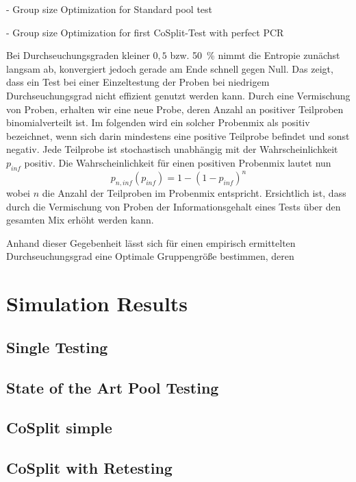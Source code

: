 \documentclass[fleqn,10pt]{wlscirep}
\begin{document}
\label{sec:analytics}
- Group size Optimization for Standard pool test

- Group size Optimization for first CoSplit-Test with perfect PCR

Bei Durchseuchungsgraden kleiner $0,5$ bzw. \SI{50}{\percent} nimmt die Entropie zunächst langsam ab, konvergiert jedoch gerade am Ende schnell gegen Null. Das zeigt, dass ein Test bei einer Einzeltestung der Proben bei niedrigem Durchseuchungsgrad nicht effizient genutzt werden kann.
Durch eine Vermischung von Proben, erhalten wir eine neue Probe, deren Anzahl an positiver Teilproben binomialverteilt ist. Im folgenden wird ein solcher Probenmix als positiv bezeichnet, wenn sich darin mindestens eine positive Teilprobe befindet und sonst negativ. Jede Teilprobe ist stochastisch unabhängig mit der Wahrscheinlichkeit $p_{inf}$ positiv. Die Wahrscheinlichkeit für einen positiven Probenmix lautet nun
\begin{equation}
p_{n,inf}(p_{inf}) = 1-(1-p_{inf})^n 
\end{equation}
wobei $n$ die Anzahl der Teilproben im Probenmix entspricht. Ersichtlich ist, dass durch die Vermischung von Proben der Informationsgehalt eines Tests über den gesamten Mix erhöht werden kann. 

Anhand dieser Gegebenheit lässt sich für einen empirisch ermittelten Durchseuchungsgrad eine Optimale Gruppengröße bestimmen, deren   


\section{Simulation Results}

\subsection{Single Testing}

\subsection{State of the Art Pool Testing}

\subsection{CoSplit simple}

\subsection{CoSplit with Retesting}
\end{document}
